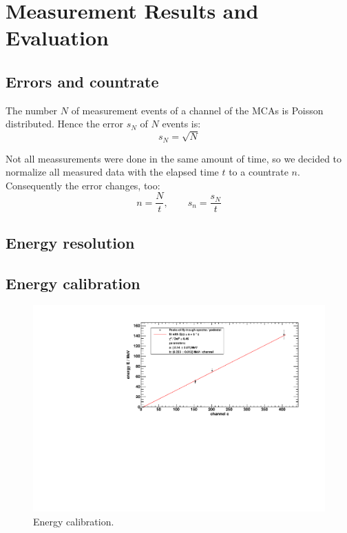 \section{Measurement Results and Evaluation}

\subsection{Errors and countrate}
The number $N$ of measurement events of a channel of the MCAs is Poisson distributed. Hence the error $s_N$  of $N$ events is:
\begin{equation}
  s_N = \sqrt{N}
\end{equation}

Not all meassurements were done in the same amount of time, so we decided to normalize all measured data with the elapsed time $t$ to a 
countrate $n$. Consequently the error changes, too:
\begin{equation}
    n = \frac{N}{t}, \qquad s_n = \frac{s_N}{t}
\end{equation}

\subsection{Energy resolution}

\subsection{Energy calibration}
\begin{figure}[H]
\begin{center}
  \includegraphics[width=\textwidth]{../img/energyCalibration.pdf}
  \caption{Energy calibration.}
  \label{img:energycalibration}
\end{center}
\end{figure}

